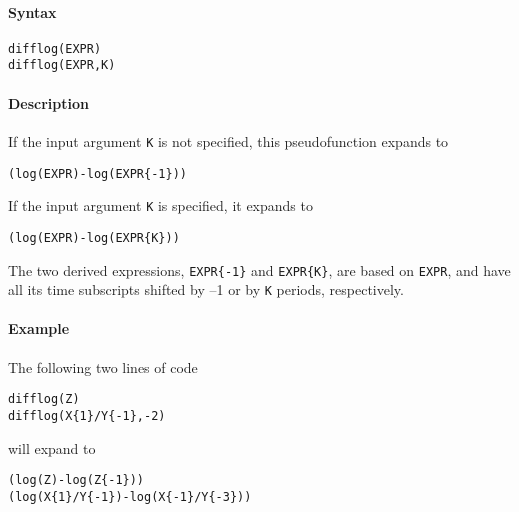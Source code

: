 


	\paragraph{Syntax}

\begin{verbatim}
difflog(EXPR)
difflog(EXPR,K)
\end{verbatim}

\paragraph{Description}

If the input argument \texttt{K} is not specified, this pseudofunction
expands to

\begin{verbatim}
(log(EXPR)-log(EXPR{-1}))
\end{verbatim}

If the input argument \texttt{K} is specified, it expands to

\begin{verbatim}
(log(EXPR)-log(EXPR{K}))
\end{verbatim}

The two derived expressions, \texttt{EXPR\{-1\}} and \texttt{EXPR\{K\}},
are based on \texttt{EXPR}, and have all its time subscripts shifted by
--1 or by \texttt{K} periods, respectively.

\paragraph{Example}

The following two lines of code

\begin{verbatim}
difflog(Z)
difflog(X{1}/Y{-1},-2)
\end{verbatim}

will expand to

\begin{verbatim}
(log(Z)-log(Z{-1}))
(log(X{1}/Y{-1})-log(X{-1}/Y{-3}))
\end{verbatim}



